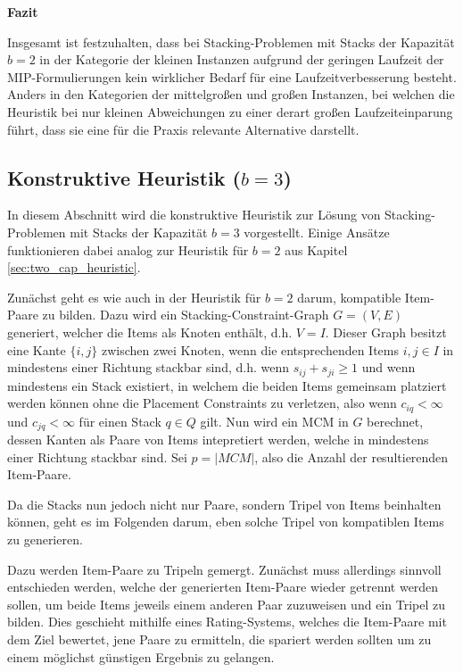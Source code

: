 \textbf{Fazit}

Insgesamt ist festzuhalten, dass bei Stacking-Problemen mit Stacks der Kapazität $b = 2$ in der Kategorie der kleinen Instanzen
aufgrund der geringen Laufzeit der MIP-Formulierungen kein wirklicher Bedarf für eine Laufzeitverbesserung besteht.
Anders in den Kategorien der mittelgroßen und großen Instanzen, bei welchen die Heuristik bei nur kleinen Abweichungen zu einer
derart großen Laufzeiteinparung führt, dass sie eine für die Praxis relevante Alternative darstellt.

\subsection{Konstruktive Heuristik ($b = 3$)}
\label{sec:three_cap_heuristic}

In diesem Abschnitt wird die konstruktive Heuristik zur Lösung von Stacking-Problemen
mit Stacks der Kapazität $b = 3$ vorgestellt. Einige Ansätze funktionieren dabei analog zur Heuristik für $b = 2$
aus Kapitel \ref{sec:two_cap_heuristic}.

Zunächst geht es wie auch in der Heuristik für $b = 2$ darum, kompatible Item-Paare zu bilden. Dazu wird ein
Stacking-Constraint-Graph $G = (V, E)$ generiert, welcher die Items als Knoten enthält, d.h. $V = I$.
Dieser Graph besitzt eine Kante $\{i, j\}$ zwischen zwei Knoten, wenn die entsprechenden Items $i, j \in I$
in mindestens einer Richtung stackbar sind, d.h. wenn $s_{ij} + s_{ji} \geq 1$ und wenn mindestens ein Stack
existiert, in welchem die beiden Items gemeinsam platziert werden können ohne die Placement Constraints zu verletzen,
also wenn $c_{iq} < \infty$ und $c_{jq} < \infty$ für einen Stack $q \in Q$ gilt. Nun wird ein \textsc{MCM} in $G$ berechnet,
dessen Kanten als Paare von Items intepretiert werden, welche in mindestens einer Richtung stackbar sind.
Sei $p = |MCM|$, also die Anzahl der resultierenden Item-Paare.

Da die Stacks nun jedoch nicht nur Paare, sondern Tripel von Items beinhalten können, geht es im Folgenden darum,
eben solche Tripel von kompatiblen Items zu generieren.

Dazu werden Item-Paare zu Tripeln gemergt. Zunächst muss allerdings sinnvoll entschieden werden, welche der generierten
Item-Paare wieder getrennt werden sollen, um beide Items jeweils einem anderen Paar zuzuweisen und ein Tripel zu bilden.
Dies geschieht mithilfe eines Rating-Systems, welches die Item-Paare mit dem Ziel bewertet, jene Paare zu ermitteln, die
spariert werden sollten um zu einem möglichst günstigen Ergebnis zu gelangen.

